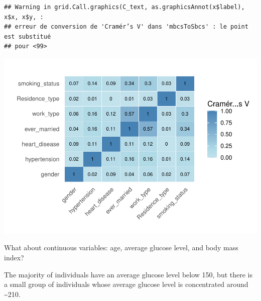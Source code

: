 \documentclass[
]{article}
\begin{document}
\begin{verbatim}
## Warning in grid.Call.graphics(C_text, as.graphicsAnnot(x$label), x$x, x$y, :
## erreur de conversion de 'Cramér’s V' dans 'mbcsToSbcs' : le point est substitué
## pour <99>
\end{verbatim}

\includegraphics{Build-deploy-stroke-prediction-model-R_files/figure-latex/unnamed-chunk-7-1.pdf}

What about continuous variables: age, average glucose level, and body
mass index?

The majority of individuals have an average glucose level below 150, but
there is a small group of individuals whose average glucose level is
concentrated around \textasciitilde210.
\end{document}
